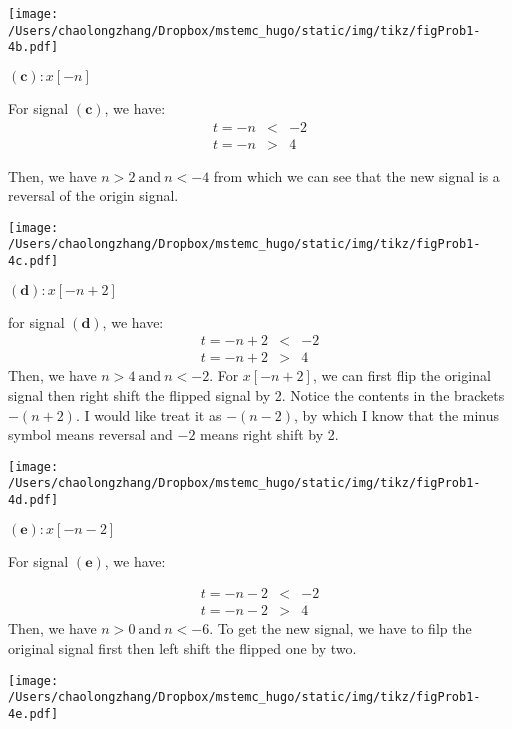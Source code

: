 \documentclass[koma,a4paper,utopia,12pt,listings-color,microtype,paralist,colorlinks,urlcolor=red]{org-article}
\begin{document}
\begin{center}
\texttt{[image: /Users/chaolongzhang/Dropbox/mstemc\_hugo/static/img/tikz/figProb1-4b.pdf]}
\end{center}


\(\mathbf{(c)}: x[-n]\)

For signal \(\mathbf{( c )}\), we have:
\begin{eqnarray*}
t=-n&<&-2 \\
t=-n&>&4
\end{eqnarray*}

Then, we have \(n>2\ \mathrm{and} \ n<-4\) from which we can see that the new
signal is a reversal of the origin signal.

\begin{center}
\texttt{[image: /Users/chaolongzhang/Dropbox/mstemc\_hugo/static/img/tikz/figProb1-4c.pdf]}
\end{center}


\(\mathbf{(d)}: x[-n+2]\)

for signal \(\mathbf{(d)}\), we have:
\begin{eqnarray*}
t=-n+2&<&-2 \\
t=-n+2&>&4
\end{eqnarray*}
Then, we have \(n>4\ \mathrm{and}\ n<-2\). For \(x[-n+2]\), we can first
flip the original signal then right shift the flipped signal by 2. Notice the
contents in the brackets \(-(n+2)\). I would like treat it as \(-(n-2)\), by
which I know that the minus symbol means reversal and \(-2\) means right
shift by 2.

\begin{center}
\texttt{[image: /Users/chaolongzhang/Dropbox/mstemc\_hugo/static/img/tikz/figProb1-4d.pdf]}
\end{center}



\(\mathbf{(e)}: x[-n-2]\)

For signal \(\mathbf{(e)}\), we have:

\begin{eqnarray*}
t=-n-2&<&-2 \\
t=-n-2&>&4
\end{eqnarray*}
Then, we have \(n>0 \ \mathrm{and}\ n<-6\). To get the new signal, we have
to filp the original signal first then left shift the flipped one by two.

\begin{center}
\texttt{[image: /Users/chaolongzhang/Dropbox/mstemc\_hugo/static/img/tikz/figProb1-4e.pdf]}
\end{center}
\end{document}
